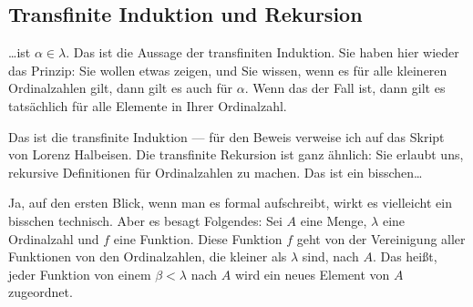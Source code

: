\subsection{Transfinite Induktion und Rekursion}

\begin{spoken-clean}[00:28:40 - 00:29:30]
\dots ist $\alpha \in \lambda$. Das ist die Aussage der transfiniten Induktion. Sie haben hier wieder das Prinzip: Sie wollen etwas zeigen, und Sie wissen, wenn es für alle kleineren Ordinalzahlen gilt, dann gilt es auch für $\alpha$. Wenn das der Fall ist, dann gilt es tatsächlich für alle Elemente in Ihrer Ordinalzahl.
\end{spoken-clean}

\begin{math-stroke}
\end{math-stroke}

\begin{spoken-clean}[00:29:30 - 00:30:10]
Das ist die transfinite Induktion --- für den Beweis verweise ich auf das Skript von Lorenz Halbeisen. Die transfinite Rekursion ist ganz ähnlich: Sie erlaubt uns, rekursive Definitionen für Ordinalzahlen zu machen. Das ist ein bisschen\dots
\end{spoken-clean}

\begin{spoken-clean}[00:30:10 - 00:31:41]
Ja, auf den ersten Blick, wenn man es formal aufschreibt, wirkt es vielleicht ein bisschen technisch. Aber es besagt Folgendes: Sei $A$ eine Menge, $\lambda$ eine Ordinalzahl und $f$ eine Funktion. Diese Funktion $f$ geht von der Vereinigung aller Funktionen von den Ordinalzahlen, die kleiner als $\lambda$ sind, nach $A$. Das heißt, jeder Funktion von einem $\beta < \lambda$ nach $A$ wird ein neues Element von $A$ zugeordnet.
\end{spoken-clean}

\begin{math-stroke}
\end{math-stroke}


